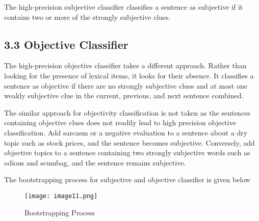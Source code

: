 \documentclass[12pt]{article}
\begin{document}
\tab The high-precision subjective classifier classifies a sentence as subjective if it contains two or more of the strongly subjective clues.\par

\subsection*{3.3 Objective Classifier}
\tab The high-precision objective classifier takes a different approach. Rather than looking for the presence of lexical items, it looks for their absence. It classifies a sentence as objective if there are no strongly subjective clues and at most one weakly subjective clue in the current, previous, and next sentence combined.\par

\tab The similar approach for objectivity classification is not taken as the sentences containing objective clues does not readily lead to high precision objective classification. Add sarcasm or a negative evaluation to a sentence about a dry topic such as stock prices, and the sentence becomes subjective. Conversely, add objective topics to a sentence containing two strongly subjective words such as odious and scumbag, and the sentence remains subjective.\par


\vspace{\baselineskip}
The bootstrapping process for subjective and objective classifier is given below\par


\vspace{\baselineskip}
\begin{Center}



\begin{figure}[H]
	\begin{Center}
		\texttt{[image: image11.png]}
		\caption{Bootstrapping Process}
		\label{fig:Bootstrapping Process}
	\end{Center}
\end{figure}



\\
\textbf{}
\end{Center}\par
\end{document}
